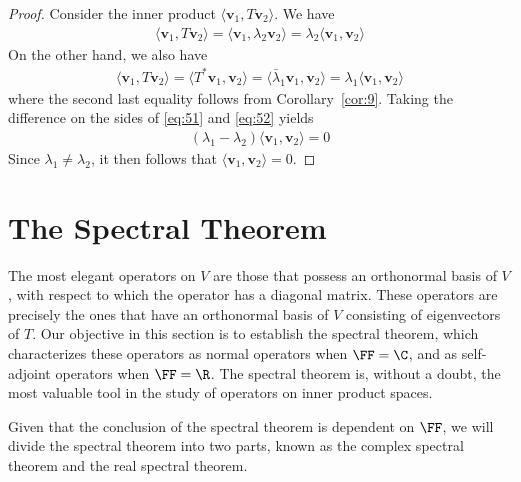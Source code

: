 \documentclass[thmcnt=section, color=blue, 12pt]{my-elegantbook}
\begin{document}
\begin{proof}
	Consider the inner product $\langle \mathbf{v}_1, T \mathbf{v}_2 \rangle$.
	We have 
	\begin{align}
		\langle \mathbf{v}_1, T \mathbf{v}_2 \rangle
		= \langle \mathbf{v}_1, \lambda_2 \mathbf{v}_2 \rangle
		= \lambda_2 \langle \mathbf{v}_1,  \mathbf{v}_2 \rangle
		\label{eq:51}
	\end{align}
	On the other hand, we also have 
	\begin{align}
		\langle \mathbf{v}_1, T \mathbf{v}_2 \rangle
		= \langle T^\ast \mathbf{v}_1, \mathbf{v}_2 \rangle
		= \langle \bar{\lambda}_1 \mathbf{v}_1, \mathbf{v}_2 \rangle
		= \lambda_1 \langle \mathbf{v}_1, \mathbf{v}_2 \rangle
		\label{eq:52}
	\end{align}
	where the second last equality follows from Corollary~\ref{cor:9}.
	Taking the difference on the sides of \eqref{eq:51} and \eqref{eq:52}
	yields
	\begin{align*}
		(\lambda_1 - \lambda_2) \langle \mathbf{v}_1, \mathbf{v}_2 \rangle
		= 0
	\end{align*}
	Since $\lambda_1 \neq \lambda_2$, it then follows 
	that $\langle \mathbf{v}_1, \mathbf{v}_2 \rangle = 0$. 
\end{proof}


\section{The Spectral Theorem}


The most elegant operators on $V$ 
are those that possess an orthonormal basis of $V$, 
with respect to which the operator has a diagonal matrix. 
These operators 
are precisely the ones that have an orthonormal basis of $V$ 
consisting of eigenvectors of $T$. 
Our objective in this section is to establish the spectral theorem, 
which characterizes these operators as normal operators when $\FF = \C$, 
and as self-adjoint operators when $\FF = \R$. 
The spectral theorem is, without a doubt, 
the most valuable tool in the study of operators 
on inner product spaces. 

Given that the conclusion of the spectral theorem is dependent on $\FF$, 
we will divide the spectral theorem into two parts, 
known as the complex spectral theorem and the real spectral theorem.

\end{document}
